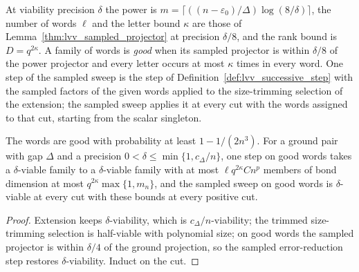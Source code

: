\begin{definition}
    \label{def:lvv_sampled_sweep}
    \leanok
    At viability precision $\delta$ the power is $m=\lceil((n-\varepsilon_0)/\Delta)
        \log(8/\delta)\rceil$, the number of words $\ell$ and the letter bound
    $\kappa$ are those of Lemma~\ref{thm:lvv_sampled_projector}
    at precision $\delta/8$, and the rank bound is $D=q^{2\kappa}$. A family of
    words is \emph{good} when its sampled projector is within $\delta/8$ of the
    power projector and every letter occurs at most $\kappa$ times in every
    word. One step of the sampled sweep is the step of
    Definition~\ref{def:lvv_successive_step} with the sampled factors of the
    given words applied to the size-trimming selection of the extension; the
    sampled sweep applies it at every cut with the words assigned to that cut,
    starting from the scalar singleton.
\end{definition}

\begin{lemma}
    \label{thm:lvv_sampled_sweep_spec}
    \leanok
    The words are good with probability at least $1-1/(2n^3)$. For a ground
    pair with gap $\Delta$ and a precision $0<\delta\le\min\{1,c_\Delta/n\}$, one
    step on good words takes a $\delta$-viable family to a $\delta$-viable family
    with at most $\ell q^{2\kappa}C n^{p}$ members of bond dimension at most
    $q^{2\kappa}\max\{1,m_n\}$, and the sampled sweep on good words is
    $\delta$-viable at every cut with these bounds at every positive cut.
\end{lemma}
\begin{proof}
    \leanok
    Extension keeps $\delta$-viability, which is $c_\Delta/n$-viability; the
    trimmed size-trimming selection is half-viable with polynomial size; on good
    words the sampled projector is within $\delta/4$ of the ground projection,
    so the sampled error-reduction step restores $\delta$-viability. Induct on
    the cut.
\end{proof}

